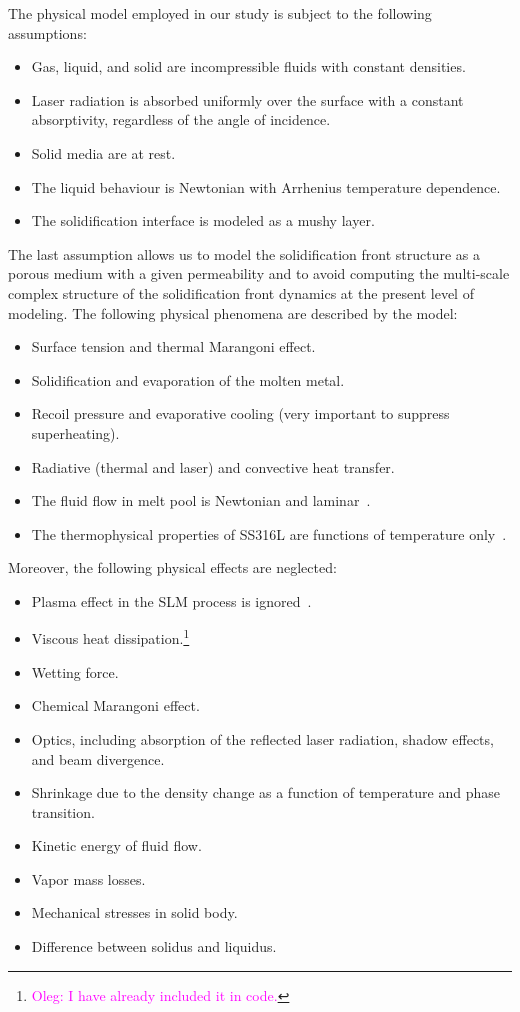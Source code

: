 \documentclass[final]{elsarticle} %
\newcommand{\Oleg}[1]{\protect\footnote{\textcolor{magenta}{Oleg: #1}}} %
\begin{document}
The physical model employed in our study is subject to the following assumptions:
\begin{itemize}
    \item Gas, liquid, and solid are incompressible fluids with constant densities.
    \item Laser radiation is absorbed uniformly over the surface with a constant absorptivity, regardless of the angle of incidence.
    \item Solid media are at rest.
    \item The liquid behaviour is Newtonian with Arrhenius temperature dependence.
    \item The solidification interface is modeled as a mushy layer.
\end{itemize}
The last assumption allows us to model the solidification front structure as a porous medium
with a given permeability and to avoid computing the multi-scale complex structure
of the solidification front dynamics at the present level of modeling.
The following physical phenomena are described by the model:
\begin{itemize}
    \item Surface tension and thermal Marangoni effect.
    \item Solidification and evaporation of the molten metal.
    \item Recoil pressure and evaporative cooling (very important to suppress superheating).
    \item Radiative (thermal and laser) and convective heat transfer.
    \item The fluid flow in melt pool is Newtonian and laminar~\cite{tang2018numerical}.
    \item The thermophysical properties of SS316L are functions of temperature only~\cite{tang2018numerical}.
\end{itemize}
Moreover, the following physical effects are neglected:
\begin{itemize}
    \item Plasma effect in the SLM process is ignored~\cite{tang2018numerical}.
    \item Viscous heat dissipation.\Oleg{I have already included it in code.}
    \item Wetting force.
    \item Chemical Marangoni effect.
    \item Optics, including absorption of the reflected laser radiation, shadow effects, and beam divergence.
    \item Shrinkage due to the density change as a function of temperature and phase transition.
    \item Kinetic energy of fluid flow.
    \item Vapor mass losses.
    \item Mechanical stresses in solid body.
    \item Difference between solidus and liquidus.
\end{itemize}
\end{document}
